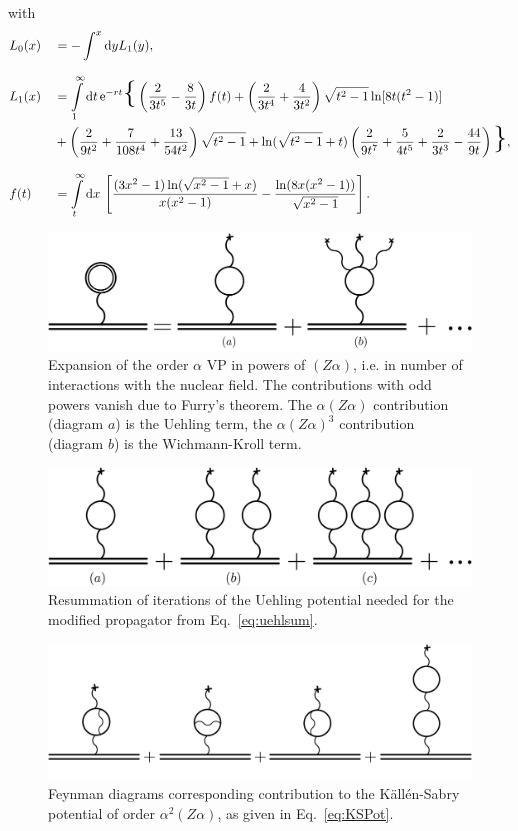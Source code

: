 with
\begin{alignat}{2}
&L_0(x)&&=-\int^x\text{d}yL_1(y),\\[7.5pt]
&L_1(x) &&= \int\limits_1^\infty\text{d}t\,\e^{-rt}\text{\huge\{}
\left(\frac{2}{3t^5}-\frac{8}{3t}\right)f(t)
+\left(\frac{2}{3t^4}+\frac{4}{3t^2}\right)\sqrt{t^2-1}\ln[8t(t^2-1)]\\
&&&+\left(\frac{2}{9t^2}+\frac{7}{108t^4}+\frac{13}{54t^2}\right)\sqrt{t^2-1}
+\ln (\sqrt{t^2-1}+t)\left(\frac{2}{9t^7}+\frac{5}{4t^5}+\frac{2}{3t^3}-\frac{44}{9t}\right)
\text{\huge\}},\\[7.5pt]
&f(t) &&= \int\limits_t^\infty\text{d}x\,
\left[
\frac{(3x^2-1)\ln (\sqrt{x^2-1}+x)}{x(x^2-1)}-
\frac{\ln(8x(x^2-1))}{\sqrt{x^2-1}}
\right].
\end{alignat}
%
\begin{figure}%
\centering
\includegraphics[width=0.75\linewidth]{pics/vac_pol_wk.pdf}%
\caption{Expansion of the order $\alpha$ VP in powers of $(Z\alpha)$, i.e. in number of interactions with the nuclear field. The contributions with odd powers vanish due to Furry's theorem. The $\alpha(Z\alpha)$ contribution (diagram $a$) is the Uehling term, the $\alpha(Z\alpha)^3$ contribution (diagram $b$) is the Wichmann-Kroll term.}%
\label{fig:vac_pol_wk}%
\end{figure}
%
%
\begin{figure}%
\centering
\includegraphics[width=0.8\linewidth]{pics/vac_pol_uehl.pdf}%
\caption{Resummation of iterations of the Uehling potential needed for the modified propagator from Eq.~\eqref{eq:uehlsum}.}%
\label{fig:vac_pol_uehl}%
\end{figure}
%
%
\begin{figure}%
\centering
\includegraphics[width=0.9\linewidth]{pics/vac_pol_ks.pdf}%
\caption{Feynman diagrams corresponding contribution to the Källén-Sabry potential of order $\alpha^2(Z\alpha)$, as given in Eq.~\eqref{eq:KSPot}.}%
\label{fig:vac_pol_ks}%
\end{figure}
%
